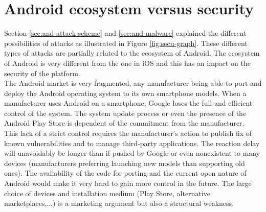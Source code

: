 \section{Android ecosystem versus security}
\label{sec:and-echosystem}

Section \ref{sec:and-attack-scheme} and \ref{sec:and-malware} explained the different possibilities of attacks as illustrated in Figure \ref{fig:secu-graph}.
These different types of attacks are partially related to the ecosystem of Android.
The ecosystem of Android is very different from the one in iOS and this has an impact on the security of the platform.\\

The Android market is very fragmented, any manufacturer being able to port and deploy the Android operating system to its own smartphone models.
When a manufacturer uses Android on a smartphone, Google loses the full and efficient control of the system.
The system update process or even the presence of the Android Play Store is dependent of the commitment from the manufacturer.\\

This lack of a strict control requires  the manufacturer's action to publish fix of known vulnerabilities and to manage third-party applications.
The reaction delay will unavoidably be longer than if pushed by Google or even nonexistent to many devices (manufacturers preferring launching new models than supporting old ones).
The availability of the code for porting and the current open nature of Android would make it very hard to gain more control in the future.
The large choice of devices and installation medium (Play Store, alternative marketplaces,...) is a marketing argument but also a structural weakness.
